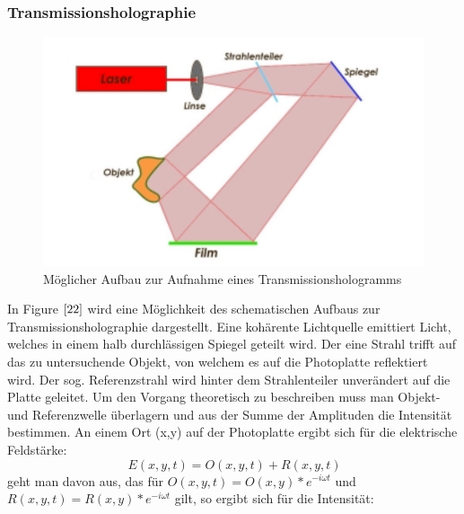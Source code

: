 \documentclass[12pt,a4paper]{article}
\begin{document}
\subsubsection{Transmissionsholographie}

\begin{figure}[h]
	\includegraphics[scale = 0.5]{Trans.png}
	\centering
	\caption{Möglicher Aufbau zur Aufnahme eines Transmissionshologramms}
	\label{22}
\end{figure}

In Figure $\ref{22}$ wird eine Möglichkeit des schematischen Aufbaus zur Transmissionsholographie dargestellt. Eine kohärente Lichtquelle emittiert  Licht, welches in einem halb durchlässigen Spiegel geteilt wird. Der eine Strahl trifft auf das zu untersuchende Objekt, von welchem es auf die Photoplatte reflektiert wird. Der sog. Referenzstrahl wird hinter dem Strahlenteiler unverändert auf die Platte geleitet. Um den Vorgang theoretisch zu beschreiben muss man Objekt- und Referenzwelle überlagern und aus der Summe der Amplituden die Intensität bestimmen. An einem Ort (x,y) auf der Photoplatte ergibt sich für die elektrische Feldstärke:
\begin{equation}
\ E(x,y,t) = O(x,y,t) + R(x,y,t)
\label {1}
\end{equation}
geht man davon aus, das für $O(x,y,t)=O(x,y)*e^{-i\omega t}$ und $R(x,y,t)=R(x,y)*e^{-i\omega t}$ gilt, so ergibt sich für die Intensität:
\end{document}
